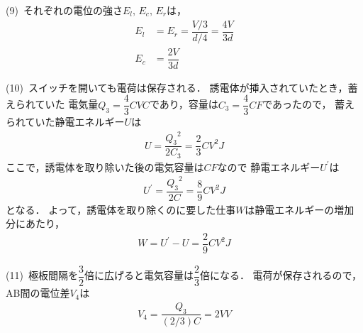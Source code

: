 \noindent (9)\,
それぞれの電位の強さ$E_l,\,E_c,\,E_r$は，
\begin{align*}
  E_l &= E_r = \dfrac{V/3}{d/4} = \dfrac{4V}{3d} \\
  E_c &= \dfrac{2V}{3d}
\end{align*}

\noindent (10)\, 
スイッチを開いても電荷は保存される．
誘電体が挿入されていたとき，蓄えられていた
電気量$Q_3=\dfrac{4}{3}CV\unit{C}$であり，容量は$C_3=\dfrac{4}{3}C\unit{F}$であったので，
蓄えられていた静電エネルギー$U$は
\begin{align*}
  U = \dfrac{{Q_3}^2}{2{C_3}} = \dfrac{2}{3}CV^2\unit{J}
\end{align*}
ここで，誘電体を取り除いた後の電気容量は$C\unit{F}$なので
静電エネルギー$U^\prime$は
\begin{align*}
  U^\prime = \dfrac{{Q_3}^2}{2C} = \dfrac{8}{9}CV^2\unit{J}
\end{align*}
となる．
よって，誘電体を取り除くのに要した仕事$W$は静電エネルギーの増加分にあたり，
\begin{align*}
  W = U^\prime-U = \dfrac{2}{9}CV^2\unit{J}
\end{align*}

\noindent (11)\, 
極板間隔を$\dfrac{3}{2}$倍に広げると電気容量は$\dfrac{2}{3}$倍になる．
電荷が保存されるので，AB間の電位差$V_4$は
\begin{align*}
  V_4 = \dfrac{Q_3}{(2/3)C} = 2V\unit{V}
\end{align*}

